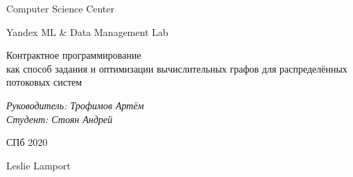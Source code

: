 \documentclass[a4paper,12pt]{article}
\begin{document}
\thispagestyle{empty}
\begin{center}
    Computer Science Center

    Yandex ML \& Data Management Lab
\end{center}
\vspace{13ex}

\begin{center}
    \vspace{16ex}
    \begin{spacing}{1.5}
        {\Large Контрактное программирование \\как способ задания и оптимизации вычислительных графов для распределённых потоковых систем}
    \end{spacing}
\end{center}
\vfill
\begin{flushright}
    \noindent
    \textit{Руководитель: Трофимов Артём} \\
    \textit{Студент: Стоян Андрей}
\end{flushright}
\vspace{5ex}
\begin{center}
    СПб 2020
\end{center}
\newpage

\tableofcontents
\newpage












\begin{thebibliography}{9}
     Leslie Lamport
\end{thebibliography}
\end{document}
